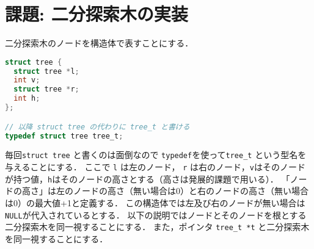 \documentclass[a4paper,twoside,onecolumn,openany,article]{memoir}
\theoremstyle{remark}
\begin{document}
\section{課題: 二分探索木の実装}
二分探索木のノードを構造体で表すことにする．
\begin{lstlisting}[basicstyle=\ttfamily\small,showstringspaces=false,language=C,frame=single]
struct tree {
  struct tree *l;
  int v;
  struct tree *r;
  int h;
};

// 以降 struct tree の代わりに tree_t と書ける
typedef struct tree tree_t;
\end{lstlisting}
毎回\texttt{struct tree} と書くのは面倒なので \texttt{typedef}を使って\texttt{tree\_t} という型名を与えることにする．
ここで \texttt{l} は左のノード， \texttt{r} は右のノード，\texttt{v}はそのノードが持つ値，\texttt{h}はそのノードの高さとする（高さは発展的課題で用いる）．
「ノードの高さ」は左のノードの高さ（無い場合は0）と右のノードの高さ（無い場合は0）の最大値+1と定義する．
この構造体では左及び右のノードが無い場合は\texttt{NULL}が代入されているとする．
以下の説明ではノードとそのノードを根とする二分探索木を同一視することにする．
また，ポインタ \texttt{tree\_t *t} と二分探索木を同一視することにする．
\end{document}
